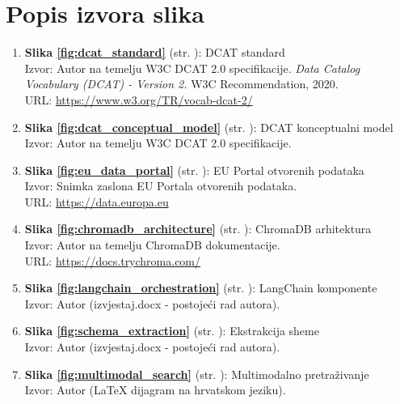 \chapter*{Popis izvora slika}

\begin{enumerate}

\item \textbf{Slika \ref{fig:dcat_standard}} (str. \pageref{fig:dcat_standard}): DCAT standard \\
Izvor: Autor na temelju W3C DCAT 2.0 specifikacije. \textit{Data Catalog Vocabulary (DCAT) - Version 2.} W3C Recommendation, 2020. \\
URL: \url{https://www.w3.org/TR/vocab-dcat-2/}

\item \textbf{Slika \ref{fig:dcat_conceptual_model}} (str. \pageref{fig:dcat_conceptual_model}): DCAT konceptualni model \\
Izvor: Autor na temelju W3C DCAT 2.0 specifikacije.

\item \textbf{Slika \ref{fig:eu_data_portal}} (str. \pageref{fig:eu_data_portal}): EU Portal otvorenih podataka \\
Izvor: Snimka zaslona EU Portala otvorenih podataka. \\
URL: \url{https://data.europa.eu}

\item \textbf{Slika \ref{fig:chromadb_architecture}} (str. \pageref{fig:chromadb_architecture}): ChromaDB arhitektura \\
Izvor: Autor na temelju ChromaDB dokumentacije. \\
URL: \url{https://docs.trychroma.com/}

\item \textbf{Slika \ref{fig:langchain_orchestration}} (str. \pageref{fig:langchain_orchestration}): LangChain komponente \\
Izvor: Autor (izvjestaj.docx - postojeći rad autora).

\item \textbf{Slika \ref{fig:schema_extraction}} (str. \pageref{fig:schema_extraction}): Ekstrakcija sheme \\
Izvor: Autor (izvjestaj.docx - postojeći rad autora).

\item \textbf{Slika \ref{fig:multimodal_search}} (str. \pageref{fig:multimodal_search}): Multimodalno pretraživanje \\
Izvor: Autor (LaTeX dijagram na hrvatskom jeziku).


\end{enumerate}
